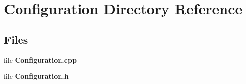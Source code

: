 \section{Configuration Directory Reference}
\label{dir_64387ea9bbe6fc952e4d6bb8dd3c13de}
\subsection*{Files}
\begin{DoxyCompactItemize}
\item 
file {\bfseries Configuration.\+cpp}
\item 
file {\bfseries Configuration.\+h}
\end{DoxyCompactItemize}
